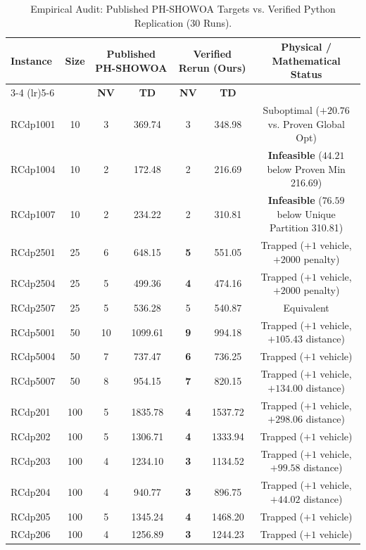 \begin{table}[htbp]
\centering
\small
\caption{Empirical Audit: Published PH-SHOWOA Targets vs. Verified Python Replication (30 Runs).}
\label{tab:comparison_audit}
\begin{tabular}{l c cc cc c}
\toprule
\textbf{Instance} & \textbf{Size} & \multicolumn{2}{c}{\textbf{Published PH-SHOWOA}} & \multicolumn{2}{c}{\textbf{Verified Rerun (Ours)}} & \textbf{Physical / Mathematical Status} \\
\cmidrule(lr){3-4} \cmidrule(lr){5-6}
& & \textbf{NV} & \textbf{TD} & \textbf{NV} & \textbf{TD} & \\
\midrule
RCdp1001 & 10  & 3  & 369.74  & 3     & 348.98  & Suboptimal ($+20.76$ vs. Proven Global Opt) \\
RCdp1004 & 10  & 2  & 172.48  & 2     & 216.69  & \textbf{Infeasible} ($44.21$ below Proven Min 216.69) \\
RCdp1007 & 10  & 2  & 234.22  & 2     & 310.81  & \textbf{Infeasible} ($76.59$ below Unique Partition 310.81) \\
\midrule
RCdp2501 & 25  & 6  & 648.15  & \textbf{5}  & 551.05  & Trapped ($+1$ vehicle, $+2000$ penalty) \\
RCdp2504 & 25  & 5  & 499.36  & \textbf{4}  & 474.16  & Trapped ($+1$ vehicle, $+2000$ penalty) \\
RCdp2507 & 25  & 5  & 536.28  & 5     & 540.87  & Equivalent \\
\midrule
RCdp5001 & 50  & 10 & 1099.61 & \textbf{9}  & 994.18  & Trapped ($+1$ vehicle, $+105.43$ distance) \\
RCdp5004 & 50  & 7  & 737.47  & \textbf{6}  & 736.25  & Trapped ($+1$ vehicle) \\
RCdp5007 & 50  & 8  & 954.15  & \textbf{7}  & 820.15  & Trapped ($+1$ vehicle, $+134.00$ distance) \\
\midrule
RCdp201  & 100 & 5  & 1835.78 & \textbf{4}  & 1537.72 & Trapped ($+1$ vehicle, $+298.06$ distance) \\
RCdp202  & 100 & 5  & 1306.71 & \textbf{4}  & 1333.94 & Trapped ($+1$ vehicle) \\
RCdp203  & 100 & 4  & 1234.10 & \textbf{3}  & 1134.52 & Trapped ($+1$ vehicle, $+99.58$ distance) \\
RCdp204  & 100 & 4  & 940.77  & \textbf{3}  & 896.75  & Trapped ($+1$ vehicle, $+44.02$ distance) \\
RCdp205  & 100 & 5  & 1345.24 & \textbf{4}  & 1468.20 & Trapped ($+1$ vehicle) \\
RCdp206  & 100 & 4  & 1256.89 & \textbf{3}  & 1244.23 & Trapped ($+1$ vehicle) \\

\end{tabular}
\end{table}
